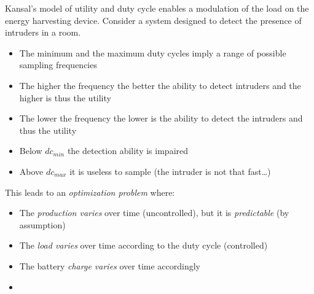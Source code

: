 
Kansal's model of utility and duty cycle enables a modulation of the load on the energy harvesting device.
Consider a system designed to detect the presence of intruders in a room.
\begin{itemize}
   \item The minimum and the maximum duty cycles imply a range of possible sampling frequencies
   \item The higher the frequency the better the ability to detect intruders and the higher is thus the
   utility
   \item The lower the frequency the lower is the ability to detect the intruders and thus the utility
   \item Below $dc_{min}$ the detection ability is impaired
   \item Above $dc_{max}$ it is useless to sample (the intruder is not that fast\dots)
\end{itemize}

{\ns This leads to an \textit{optimization problem} where:
\begin{itemize}
   \item The \textit{production varies} over time (uncontrolled), but it is \textit{predictable} (by assumption)
   \item The \textit{load varies} over time according to the duty cycle (controlled)
   \item The battery \textit{charge varies} over time accordingly
   \item[] 
\end{itemize}}
\nl

